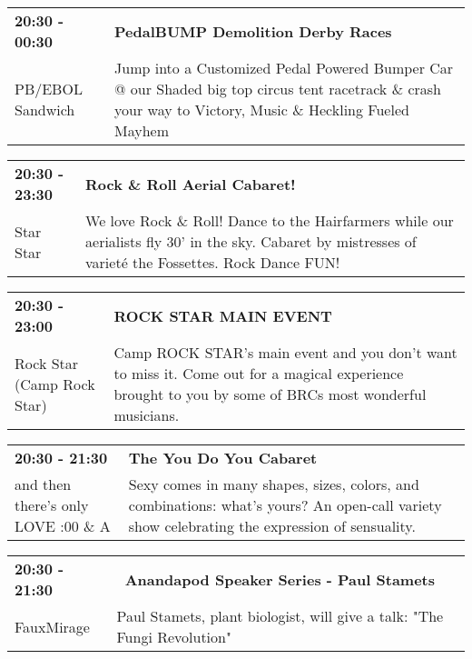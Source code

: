 \begin{tabular}{ p{1in} p{2.2in} }
    \textbf{20:30 - 00:30} & \textbf{PedalBUMP Demolition Derby Races} \\
    PB/EBOL Sandwich \newline  & Jump into a Customized Pedal Powered Bumper Car @ our Shaded big top circus tent racetrack \& crash your way to Victory, Music \& Heckling Fueled Mayhem \\
    \hline 
\end{tabular}
    
\begin{tabular}{ p{1in} p{2.2in} }
    \textbf{20:30 - 23:30} & \textbf{Rock \& Roll Aerial Cabaret!} \\
    Star Star \newline  & We love Rock \& Roll! Dance to the Hairfarmers while our aerialists fly 30' in the sky. Cabaret by mistresses of variet\'e the Fossettes. Rock Dance FUN! \\
    \hline 
\end{tabular}
    
\begin{tabular}{ p{1in} p{2.2in} }
    \textbf{20:30 - 23:00} & \textbf{ROCK STAR MAIN EVENT} \\
    Rock Star (Camp Rock Star) \newline  & Camp ROCK STAR's main event and you don't want to miss it. Come out for a magical experience brought to you by some of BRCs most wonderful musicians. \\
    \hline 
\end{tabular}
    
\begin{tabular}{ p{1in} p{2.2in} }
    \textbf{20:30 - 21:30} & \textbf{ The You Do You Cabaret} \\
    and then there's only LOVE \newline 4:00 \& A & Sexy comes in many shapes, sizes, colors, and combinations: what's yours? An open-call variety show celebrating the expression of sensuality. \\
    \hline 
\end{tabular}
    
\begin{tabular}{ p{1in} p{2.2in} }
    \textbf{20:30 - 21:30} & \textbf{~Anandapod Speaker Series - Paul Stamets} \\
    FauxMirage \newline  & Paul Stamets, plant biologist, will give a talk: "The Fungi Revolution" \\
    \hline 
\end{tabular}
    

